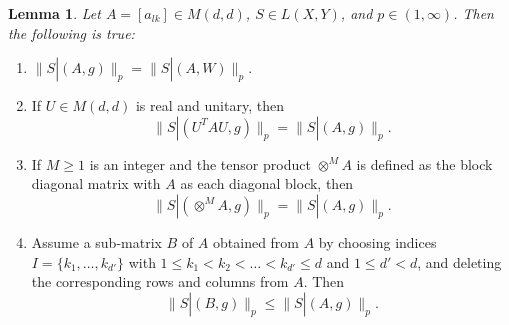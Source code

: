 \documentclass[11pt,a4paper,twoside,draft]{amsart}
\theoremstyle{definition}
\newtheorem{lemma}{Lemma}[section]
\newcommand{\lem}[1]{\begin{lemma}\label{#1}\sl }
\newcommand{\elem}{\end{lemma}}
\newcommand{\ito}[3]{\| #1 |(#2 ,W)\|_{#3}}
\newcommand{\dito}[3]{\| #1 |(#2 ,g)\|_{#3}}
\begin{document}
\lem{le:properties_Gaussian_martingales}
Let $A=[a_{lk}]\in M(d,d)$,  
$S\in L(X,Y)$, and $p\in (1,\infty)$.
Then the following is true:
\begin{enumerate}[{\rm (i)}]
\item $\dito{S}{A}{p}=\ito{S}{A}{p}.$
\item If $U\in M(d,d)$ is real and unitary, then 
      \[ \dito{S}{U^TAU}{p}=\dito{S}{A}{p}. \]
\item If $M\geq 1$ is an integer and the tensor product
      $\otimes^M A$ is defined as the block diagonal matrix with $A$
      as each diagonal block, then
      \[ \dito{S}{\otimes^M A}{p}=\dito{S}{A}{p}. \]
\item Assume a sub-matrix $B$ of $A$ obtained from $A$ by choosing 
      indices $I=\{ k_1,\ldots,k_{d'}\}$ with
      $1\leq k_1<k_2<\ldots < k_{d'} \leq d$ and $1\le d' < d$,
      and deleting the corresponding rows and columns from $A$.
      Then
      \[ \dito{S}{B}{p}\leq\dito{S}{A}{p}. \]
\end{enumerate}
\elem
\end{document}
